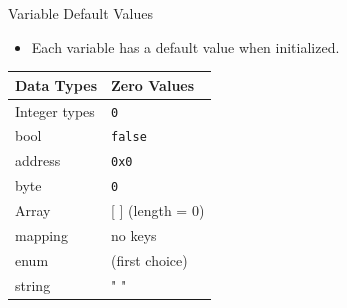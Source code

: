 \documentclass[handout]{beamer}
\begin{document}
\begin{frame}{Variable Default Values}

	\begin{itemize}
		\item Each variable has a default value when initialized.
	\end{itemize}

	\begin{table}
		\begin{tabular}{m{4cm} m{4cm}}
		\rowcolor{highlight}
			\hline
			Data Types & Zero Values\\
			\hline 
			\rowcolor{brightanthracite}
			Integer types & \texttt{0} \\
			bool &  \texttt{false} \\
			\rowcolor{brightanthracite}
			address & \texttt{0x0} \\
			byte & \texttt{0} \\
			\rowcolor{brightanthracite}
			Array & [ ] (length = 0) \\
			mapping & no keys \\
			\rowcolor{brightanthracite}
			enum & (first choice) \\
			string & " " \\
			\hline
		\end{tabular}
	\end{table}	
	
\end{frame}

\end{document}
